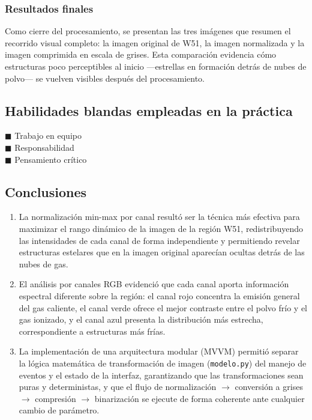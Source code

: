 \documentclass[11pt]{article}
\begin{document}

\subsubsection{Resultados finales}

Como cierre del procesamiento, se presentan las tres imágenes que resumen el recorrido visual completo: la imagen original de W51, la imagen normalizada y la imagen comprimida en escala de grises. Esta comparación evidencia cómo estructuras poco perceptibles al inicio —estrellas en formación detrás de nubes de polvo— se vuelven visibles después del procesamiento.


\subsection{Habilidades blandas empleadas en la práctica}
$\blacksquare$ Trabajo en equipo \\
$\blacksquare$ Responsabilidad \\
$\blacksquare$ Pensamiento crítico

\subsection{Conclusiones}
\begin{enumerate}
    \item La normalización min-max por canal resultó ser la técnica más efectiva para maximizar el rango dinámico de la imagen de la región W51, redistribuyendo las intensidades de cada canal de forma independiente y permitiendo revelar estructuras estelares que en la imagen original aparecían ocultas detrás de las nubes de gas.

    \item El análisis por canales RGB evidenció que cada canal aporta información espectral diferente sobre la región: el canal rojo concentra la emisión general del gas caliente, el canal verde ofrece el mejor contraste entre el polvo frío y el gas ionizado, y el canal azul presenta la distribución más estrecha, correspondiente a estructuras más frías.

    \item La implementación de una arquitectura modular (MVVM) permitió separar la lógica matemática de transformación de imagen (\texttt{modelo.py}) del manejo de eventos y el estado de la interfaz, garantizando que las transformaciones sean puras y deterministas, y que el flujo de normalización $\to$ conversión a grises $\to$ compresión $\to$ binarización se ejecute de forma coherente ante cualquier cambio de parámetro.
\end{enumerate}
\end{document}
